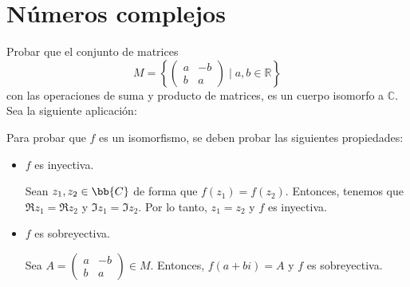 \section{Números complejos}

\begin{ejercicio}
    Probar que el conjunto de matrices
    \[
        M = \left\{ \begin{pmatrix} a & -b \\ b & a \end{pmatrix} \mid a,b \in \mathbb{R} \right\}
    \]
    con las operaciones de suma y producto de matrices, es un cuerpo isomorfo a $\mathbb{C}$.\\

    Sea la siguiente aplicación:

    Para probar que $f$ es un isomorfismo, se deben probar las siguientes propiedades:
    \begin{itemize}
        \item $f$ es inyectiva.
        
        Sean $z_1,z_2\in \bb{C}$ de forma que $f(z_1)=f(z_2)$. Entonces, tenemos que $\Re z_1=\Re z_2$ y $\Im z_1=\Im z_2$. Por lo tanto, $z_1=z_2$ y $f$ es inyectiva.

        \item $f$ es sobreyectiva.
        
        Sea $A=\begin{pmatrix} a & -b \\ b & a \end{pmatrix}\in M$. Entonces, $f(a+bi)=A$ y $f$ es sobreyectiva.

    \end{itemize}
\end{ejercicio}

